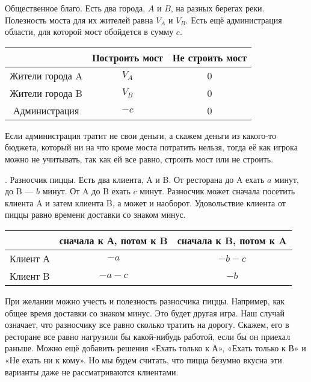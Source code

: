 \begin{myex} \label{bridge}
Общественное благо. Есть два города, $ A $ и $ B $, на разных берегах реки. Полезность моста для их жителей равна $ V_{A} $ и $ V_{B} $. Есть ещё администрация области, для которой мост обойдется в сумму $ c $.


\begin{tabular}{c|cc}
& Построить мост & Не строить мост \\
\hline
Жители города A & $ V_{A} $ & 0 \\
Жители города B & $ V_{B} $ & 0 \\
Администрация & $-c$ & 0 \\
\end{tabular}

Если администрация тратит не свои деньги, а скажем деньги из какого-то бюджета, который ни на что кроме моста потратить нельзя, тогда её как игрока можно не учитывать, так как ей все равно, строить мост или не строить.

\end{myex}

\begin{myex} \label{pizza}. Разносчик пиццы. Есть два клиента, A и B. От ресторана до A ехать $ a $ минут, до B — $ b $ минут. От A до B ехать $ c $ минут. Разносчик может сначала посетить клиента A и затем клиента B, а может и наоборот. Удовольствие клиента от пиццы равно времени доставки со знаком минус.


\begin{tabular}{c|cc}
& сначала к А, потом к B & сначала к B, потом к A \\
\hline
Клиент А & $-a$ & $-b-c$ \\
Клиент B & $-a-c$ & $-b$ \\
\end{tabular}

При желании можно учесть и полезность разносчика пиццы. Например, как общее время доставки со знаком минус. Это будет другая игра. Наш случай означает, что разносчику все равно сколько тратить на дорогу. Скажем, его в ресторане все равно нагрузили бы какой-нибудь работой, если бы он приехал раньше. Можно ещё добавить решения «Ехать только к А», «Ехать только к В» и «Не ехать ни к кому». Но мы будем считать, что пицца безумно вкусна эти варианты даже не рассматриваются клиентами.

\end{myex}


